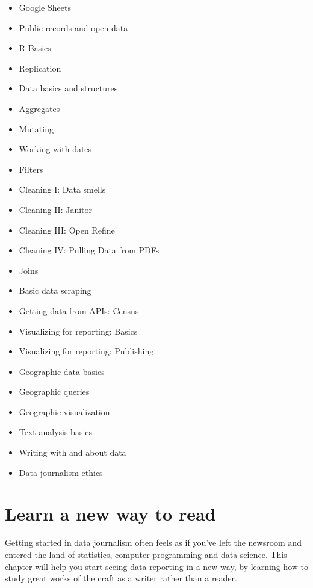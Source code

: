 \documentclass[
  letterpaper,
  DIV=11,
  numbers=noendperiod]{scrreprt}
\providecommand{\tightlist}{%
  \setlength{\itemsep}{0pt}\setlength{\parskip}{0pt}}\usepackage{longtable,booktabs,array}
\begin{document}
\begin{itemize}
\tightlist
\item
  Google Sheets
\item
  Public records and open data
\item
  R Basics
\item
  Replication
\item
  Data basics and structures
\item
  Aggregates
\item
  Mutating
\item
  Working with dates
\item
  Filters
\item
  Cleaning I: Data smells
\item
  Cleaning II: Janitor
\item
  Cleaning III: Open Refine
\item
  Cleaning IV: Pulling Data from PDFs
\item
  Joins
\item
  Basic data scraping
\item
  Getting data from APIs: Census
\item
  Visualizing for reporting: Basics
\item
  Visualizing for reporting: Publishing
\item
  Geographic data basics
\item
  Geographic queries
\item
  Geographic visualization
\item
  Text analysis basics
\item
  Writing with and about data
\item
  Data journalism ethics
\end{itemize}


\hypertarget{start-story}{%
\chapter{Learn a new way to read}\label{start-story}}

Getting started in data journalism often feels as if you've left the
newsroom and entered the land of statistics, computer programming and
data science. This chapter will help you start seeing data reporting in
a new way, by learning how to study great works of the craft as a writer
rather than a reader.
\end{document}
